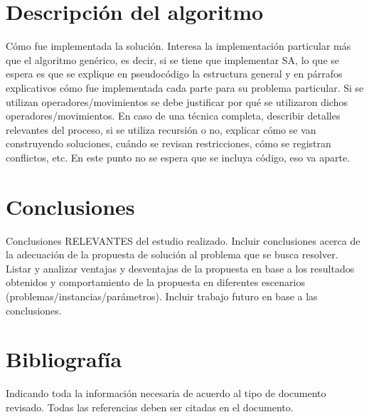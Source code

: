 \documentclass[letter, 10pt]{article}
\begin{document}
\section{Descripci\'on del algoritmo}
C\'omo fue implementada la soluci\'on. Interesa la implementaci\'on particular m\'as que el algoritmo gen\'erico, es decir, si se tiene que implementar SA, lo que se espera es que se explique en pseudoc\'odigo la estructura
general y en p\'arrafos explicativos c\'omo fue implementada cada parte para su problema particular. Si
se utilizan operadores/movimientos se debe justificar por qu\'e se utilizaron dichos operadores/movimientos. 
En caso de una t\'ecnica completa, describir detalles relevantes del proceso, si se utiliza recursi\'on o no, explicar c\'omo se van construyendo soluciones, cu\'ando se revisan restricciones, c\'omo se registran conflictos, etc. En este punto no se espera que se incluya c\'odigo, eso va aparte.
%
%

\section{Conclusiones}
Conclusiones RELEVANTES del estudio realizado. Incluir conclusiones acerca de la adecuaci\'on de la propuesta de soluci\'on al problema que se busca resolver. Listar y analizar ventajas y desventajas de la propuesta en base a los resultados obtenidos y comportamiento de la propuesta en diferentes escenarios (problemas/instancias/par\'ametros). Incluir trabajo futuro en base a las conclusiones.

\section{Bibliograf\'ia}
Indicando toda la informaci\'on necesaria de acuerdo al tipo de documento revisado. Todas las referencias deben ser citadas en el documento.



\end{document}
